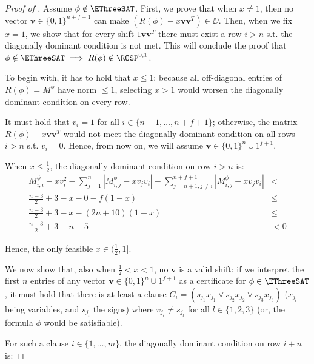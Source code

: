 \begin{proof}[Proof of ]
	Assume $\phi\notin\EThreeSAT$. First, we prove that when $x\neq1$, then no vector $\mathbf{v}\in\{0,1\}^{n+f+1}$ can make $(R(\phi) - x\mathbf{vv}^T)\in \DD$. Then, when we fix $x=1$, we show that for every shift $1 \mathbf{vv}^T$ there must exist a row $i>n$ s.t. the diagonally dominant condition is not met. This will conclude the proof that $\phi\notin\EThreeSAT \implies R(\phi)\notin\ROSP^{0,1}$.
	
	To begin with, it has to hold that $x\leq 1$: because all off-diagonal entries of $R(\phi) = M^\phi$ have norm $\leq 1$, selecting $x>1$ would worsen the diagonally dominant condition on every row. 
	
	\begin{fact} 
	\label{fact:shift_finish_with_ones}
		It must hold that $v_i=1$ for all $i\in\{n+1, \dots, n+f+1\}$; otherwise, the matrix $R(\phi) - x\mathbf{vv}^T$ would not meet the diagonally dominant condition on all rows $i>n$ s.t. $v_i=0$. Hence, from now on, we will assume $\mathbf{v}\in \{0,1\}^n\cup 1^{f+1}$.
	\end{fact}
	
	When $x\leq \frac{1}{2}$, the diagonally dominant condition on row $i>n$ is:
	\begin{align}
	M_{i,i}^\phi - x v_i^2 -  \sum_{j=1}^n|M_{i,j}^\phi - x v_j v_i| - \sum_{j=n+1, j\neq i}^{n+f+1}|M_{i,j}^\phi - x v_j v_i| & < \\
	\frac{n-3}{2} + 3 - x - 0 - f(1 - x) & \leq \\
	\frac{n-3}{2} + 3 - x  - (2n + 10)(1-x) & \leq \\
	\frac{n-3}{2} + 3 - n - 5 & < 0
	\end{align}
	
	Hence, the only feasible $x\in (\frac{1}{2}, 1]$.
	
	We now show that, also when $\frac{1}{2} < x < 1$, no $\mathbf{v}$ is a valid shift: if we interpret the first $n$ entries of any vector $\mathbf{v}\in\{0,1\}^n \cup 1^{f+1}$ as a certificate for $\phi\in\EThreeSAT$, it must hold that there is at least a clause $C_i = (s_{j_1} x_{j_1} \lor s_{j_2}x_{j_2} \lor s_{j_3}x_{j_3})$ ($x_{j_l}$ being variables, and $s_{j_l}$ the signs) where $v_{j_l} \neq s_{j_l}$ for all $l\in\{1, 2, 3\}$ (or, the formula $\phi$ would be satisfiable).
	
	For such a clause $i\in\{1,\dots,m\}$, the diagonally dominant condition on row $i+n$ is:
		

\end{proof}
